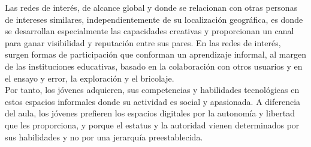 Las redes de interés, de alcance global y donde se relacionan con otras personas de intereses similares, independientemente de su localización geográfica, es donde se desarrollan especialmente las capacidades creativas y proporcionan un canal para ganar visibilidad y reputación entre sus pares. En las redes de interés, surgen formas de participación que conforman un aprendizaje informal, al margen de las instituciones educativas, basado en la colaboración con otros usuarios y en el ensayo y error, la exploración y el bricolaje. 
\\[1pt]

Por tanto, los jóvenes adquieren, sus competencias y habilidades tecnológicas en estos espacios informales donde su actividad es social y apasionada. A diferencia del aula, los jóvenes prefieren los espacios digitales por la autonomía y libertad que les proporciona, y porque el estatus y la autoridad vienen determinados por sus habilidades y no por una jerarquía preestablecida\cite{vid09}.
\\[1pt]


